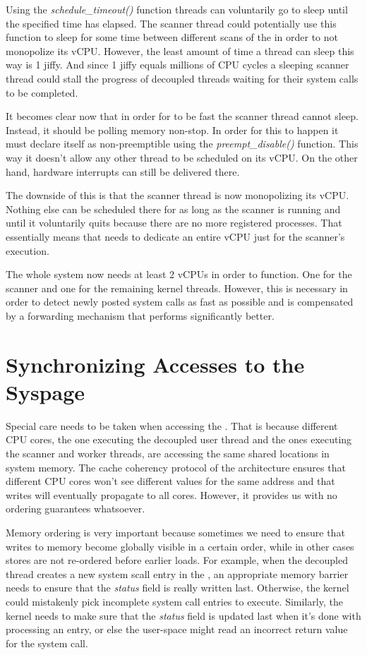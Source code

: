 Using the \emph{schedule\_timeout()} function threads can voluntarily go to
sleep until the specified time has elapsed. The scanner thread could
potentially use this function to sleep for some time between different scans of
the  in order to not monopolize its vCPU. However, the least amount of
time a thread can sleep this way is 1 jiffy. And since 1 jiffy equals millions
of CPU cycles a sleeping scanner thread could stall the progress of decoupled
threads waiting for their system calls to be completed.

It becomes clear now that in order for \memsc to be fast the scanner thread
cannot sleep. Instead, it should be polling memory non-stop. In order for this
to happen it must declare itself as non-preemptible using the
\emph{preempt\_disable()} function. This way it doesn't allow any other thread
to be scheduled on its vCPU. On the other hand, hardware interrupts can still
be delivered there.

The downside of this is that the scanner thread is now monopolizing its vCPU.
Nothing else can be scheduled there for as long as the scanner is running and
until it voluntarily quits because there are no more registered \memsc
processes. That essentially means that \llinux needs to dedicate an entire vCPU
just for the scanner's execution.

The whole system now needs at least 2 vCPUs in order to function. One for the
scanner and one for the remaining kernel threads. However, this is necessary in
order to detect newly posted system calls as fast as possible and is
compensated by a forwarding mechanism that performs significantly better.

\section{Synchronizing Accesses to the Syspage}
\label{sec:sync}

Special care needs to be taken when accessing the \sysp. That is because
different CPU cores, the one executing the decoupled user thread and the ones
executing the scanner and worker threads, are accessing the same shared
locations in system memory. The cache coherency protocol of the architecture
ensures that different CPU cores won't see different values for the same
address and that writes will eventually propagate to all cores. However, it
provides us with no ordering guarantees whatsoever.

Memory ordering is very important because sometimes we need to ensure that
writes to memory become globally visible in a certain order, while in other
cases stores are not re-ordered before earlier loads. For example, when the
decoupled thread creates a new system scall entry in the \sysp, an appropriate
memory barrier needs to ensure that the \emph{status} field is really written
last. Otherwise, the kernel could mistakenly pick incomplete system call
entries to execute. Similarly, the kernel needs to make sure that the
\emph{status} field is updated last when it's done with processing an entry, or
else the user-space might read an incorrect return value for the system call.

